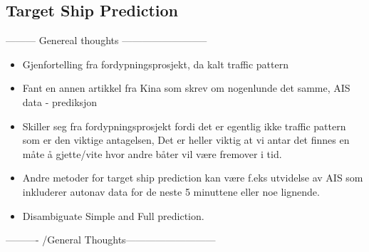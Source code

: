 \subsection{Target Ship Prediction}
--------- Genereal thoughts --------------------------
\begin{itemize}
    \item Gjenfortelling fra fordypningsprosjekt, da kalt traffic pattern
    \item Fant en annen artikkel fra Kina som skrev om nogenlunde det samme, \gls{AIS} data -\> prediksjon
    \item Skiller seg fra fordypningsprosjekt fordi det er egentlig ikke traffic pattern som er den viktige antagelsen,
    Det er heller viktig at vi antar det finnes en måte å gjette/vite hvor andre båter vil være fremover i tid.
    \item Andre metoder for target ship prediction kan være f.eks utvidelse av \gls{AIS} som 
    inkluderer autonav data for de neste 5 minuttene eller noe lignende.
    \item Disambiguate Simple and Full prediction.
\end{itemize}
---------- /General Thoughts--------------------------- 
